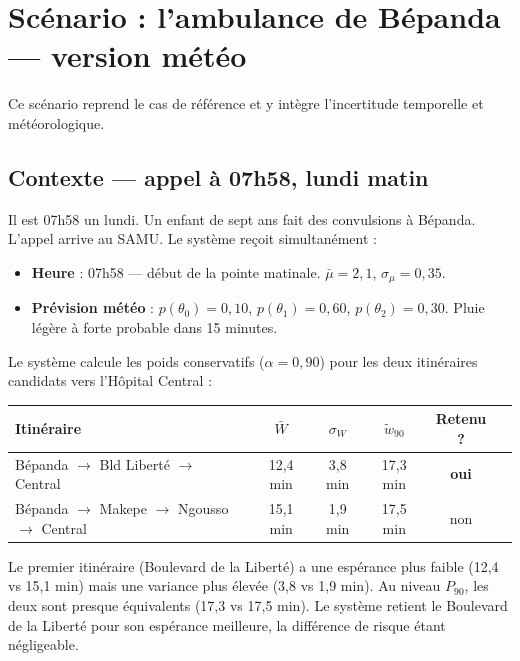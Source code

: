 \documentclass[12pt,a4paper]{article}
\theoremstyle{definition}
\theoremstyle{remark}
\begin{document}
\section{Scénario : l'ambulance de Bépanda — version météo}

Ce scénario reprend le cas de référence et y intègre l'incertitude
temporelle et météorologique.

\subsection{Contexte — appel à 07h58, lundi matin}

Il est 07h58 un lundi. Un enfant de sept ans fait des convulsions à
Bépanda. L'appel arrive au SAMU. Le système reçoit simultanément :

\begin{itemize}[leftmargin=1.5em]
  \item \textbf{Heure} : 07h58 — début de la pointe matinale.
    $\bar{\mu} = 2{,}1$, $\sigma_\mu = 0{,}35$.
  \item \textbf{Prévision météo} : $p(\theta_0) = 0{,}10$,
    $p(\theta_1) = 0{,}60$, $p(\theta_2) = 0{,}30$.
    Pluie légère à forte probable dans 15 minutes.
\end{itemize}

\noindent
Le système calcule les poids conservatifs ($\alpha = 0{,}90$) pour
les deux itinéraires candidats vers l'Hôpital Central :

\medskip
\begin{center}
\begin{tabular}{lccccc}
  \toprule
  \textbf{Itinéraire} & \textbf{$\bar{W}$} &
  \textbf{$\sigma_W$} & \textbf{$\tilde{w}_{90}$} &
  \textbf{Retenu ?} \\
  \midrule
  Bépanda $\to$ Bld Liberté $\to$ Central &
    12,4 min & 3,8 min & 17,3 min & \textbf{oui} \\
  Bépanda $\to$ Makepe $\to$ Ngousso $\to$ Central &
    15,1 min & 1,9 min & 17,5 min & non \\
  \bottomrule
\end{tabular}
\end{center}

\medskip
\noindent
Le premier itinéraire (Boulevard de la Liberté) a une espérance
plus faible (12,4 vs 15,1 min) mais une variance plus élevée
(3,8 vs 1,9 min). Au niveau $P_{90}$, les deux sont presque
équivalents (17,3 vs 17,5 min). Le système retient le Boulevard
de la Liberté pour son espérance meilleure, la différence de
risque étant négligeable.
\end{document}
